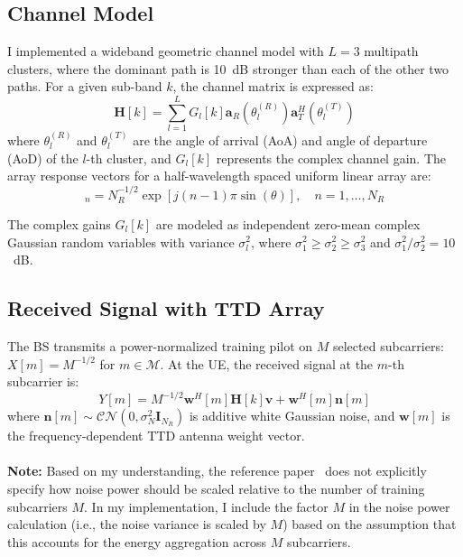 \documentclass[12pt,letterpaper]{article}
\begin{document}
\subsection{Channel Model}

I implemented a wideband geometric channel model with $L = 3$ multipath clusters, where the dominant path is 10~dB stronger than each of the other two paths. For a given sub-band $k$, the channel matrix is expressed as:
\begin{equation}
\mathbf{H}[k] = \sum_{l=1}^{L} G_l[k] \mathbf{a}_R(\theta_l^{(R)}) \mathbf{a}_T^H(\theta_l^{(T)})
\end{equation}
where $\theta_l^{(R)}$ and $\theta_l^{(T)}$ are the angle of arrival (AoA) and angle of departure (AoD) of the $l$-th cluster, and $G_l[k]$ represents the complex channel gain. The array response vectors for a half-wavelength spaced uniform linear array are:
\begin{equation}
[\mathbf{a}_R(\theta)]_n = N_R^{-1/2} \exp[j(n-1)\pi\sin(\theta)], \quad n = 1, \ldots, N_R
\end{equation}

\noindent
The complex gains $G_l[k]$ are modeled as independent zero-mean complex Gaussian random variables with variance $\sigma_l^2$, where $\sigma_1^2 \geq \sigma_2^2 \geq \sigma_3^2$ and $\sigma_1^2/\sigma_2^2 = 10$~dB.

\subsection{Received Signal with TTD Array}

The BS transmits a power-normalized training pilot on $M$ selected subcarriers: $X[m] = M^{-1/2}$ for $m \in \mathcal{M}$. At the UE, the received signal at the $m$-th subcarrier is:
\begin{equation}
Y[m] = M^{-1/2} \mathbf{w}^H[m] \mathbf{H}[k] \mathbf{v} + \mathbf{w}^H[m] \mathbf{n}[m]
\end{equation}
where $\mathbf{n}[m] \sim \mathcal{CN}(0, \sigma_N^2 \mathbf{I}_{N_R})$ is additive white Gaussian noise, and $\mathbf{w}[m]$ is the frequency-dependent TTD antenna weight vector.
\\
\\
\textbf{Note:} Based on my understanding, the reference paper~\cite{boljanovic2020design} does not explicitly specify how noise power should be scaled relative to the number of training subcarriers $M$. In my implementation, I include the factor $M$ in the noise power calculation (i.e., the noise variance is scaled by $M$) based on the assumption that this accounts for the energy aggregation across $M$ subcarriers.
\end{document}
